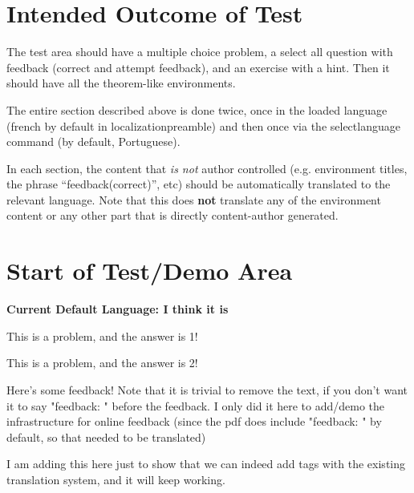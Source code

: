 \documentclass{ximera}
\begin{document}
\section{Intended Outcome of Test}

The test area should have a multiple choice problem, a select all question with feedback (correct and attempt feedback), 
and an exercise with a hint. Then it should have all the theorem-like environments.

The entire section described above is done twice, once in the loaded language (french by default in localizationpreamble)
and then once via the selectlanguage command (by default, Portuguese).

In each section, the content that \textit{is not} author controlled (e.g. environment titles, the phrase ``feedback(correct)'', etc)
should be automatically translated to the relevant language. Note that this does \textbf{not} translate any of the environment
content or any other part that is directly content-author generated.


\section{Start of Test/Demo Area}

{{\bfseries\large Current Default Language: I think it is \languagename{}}}


\begin{problem}%
    This is a problem, and the answer is 1! %
    \begin{multipleChoice}
    \end{multipleChoice}%
\end{problem}

\begin{question}
    This is a problem, and the answer is 2! %
    \begin{selectAll}
    \end{selectAll}%
    \begin{feedback}
        Here's some feedback! Note that it is trivial to remove the text, if you don't want it to say "feedback: " before the feedback. I only did it here to add/demo the infrastructure for online feedback (since the pdf does include "feedback: " by default, so that needed to be translated)%
    \end{feedback}
    \begin{feedback}[correct]
        I am adding this here just to show that we can indeed add tags with the existing translation system, and it will keep working.%
    \end{feedback}
\end{question}
\end{document}
